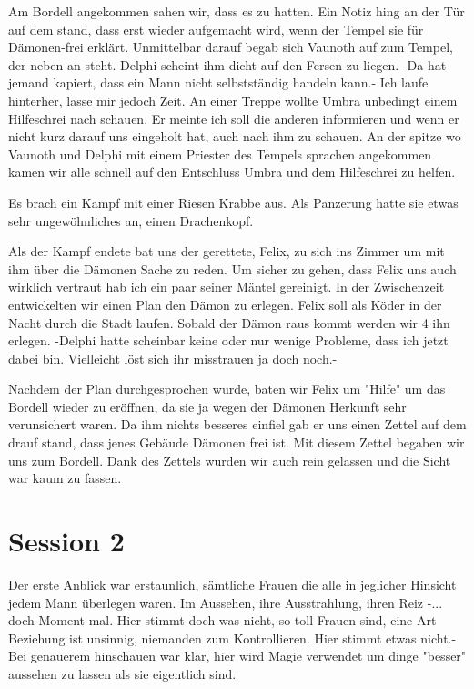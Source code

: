 \documentclass[10pt,twoside,openany]{book}
\begin{document}
	Am Bordell angekommen sahen wir, dass es zu hatten. Ein Notiz hing an der Tür auf dem stand, dass erst wieder aufgemacht wird, wenn der Tempel sie für Dämonen-frei erklärt. Unmittelbar darauf begab sich Vaunoth auf zum Tempel, der neben an steht. Delphi scheint ihm dicht auf den Fersen zu liegen. -Da hat jemand kapiert, dass ein Mann nicht selbstständig handeln kann.- Ich laufe hinterher, lasse mir jedoch Zeit. An einer Treppe wollte Umbra unbedingt einem Hilfeschrei nach schauen. Er meinte ich soll die anderen informieren und wenn er nicht kurz darauf uns eingeholt hat, auch nach ihm zu schauen. An der spitze wo Vaunoth und Delphi mit einem Priester des Tempels sprachen angekommen kamen wir alle schnell auf den Entschluss Umbra und dem Hilfeschrei zu helfen. 
	
	Es brach ein Kampf mit einer Riesen Krabbe aus. Als Panzerung hatte sie etwas sehr ungewöhnliches an, einen Drachenkopf. 
	
	Als der Kampf endete bat uns der gerettete, Felix, zu sich ins Zimmer um mit ihm über die Dämonen Sache zu reden. Um sicher zu gehen, dass Felix uns auch wirklich vertraut hab ich ein paar seiner Mäntel gereinigt. In der Zwischenzeit entwickelten wir einen Plan den Dämon zu erlegen. Felix soll als Köder in der Nacht durch die Stadt laufen. Sobald der Dämon raus kommt werden wir 4 ihn erlegen. -Delphi hatte scheinbar keine oder nur wenige Probleme, dass ich jetzt dabei bin. Vielleicht löst sich ihr misstrauen ja doch noch.-
	
	Nachdem der Plan durchgesprochen wurde, baten wir Felix um "Hilfe" um das Bordell wieder zu eröffnen, da sie ja wegen der Dämonen Herkunft sehr verunsichert waren. Da ihm nichts besseres einfiel gab er uns einen Zettel auf dem drauf stand, dass jenes Gebäude Dämonen frei ist. Mit diesem Zettel begaben wir uns zum Bordell. Dank des Zettels wurden wir auch rein gelassen und die Sicht war kaum zu fassen.
	
	\chapter{Session 2}
	Der erste Anblick war erstaunlich, sämtliche Frauen die alle in jeglicher Hinsicht jedem Mann überlegen waren. Im Aussehen, ihre Ausstrahlung, ihren Reiz -... doch Moment mal. Hier stimmt doch was nicht, so toll Frauen sind, eine Art Beziehung ist unsinnig, niemanden zum Kontrollieren. Hier stimmt etwas nicht.- Bei genauerem hinschauen war klar, hier wird Magie verwendet um dinge "besser" aussehen zu lassen als sie eigentlich sind. 
	
\end{document}
